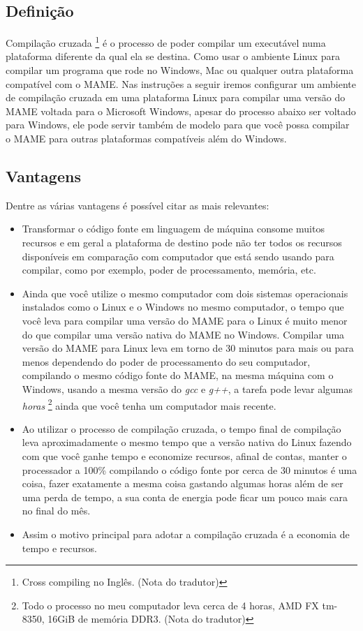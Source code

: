 \documentclass[letterpaper,10pt,brazil]{sphinxmanual}
\begin{document}
\subsection{Definição}
\label{initialsetup/crosscompilemame:definicao}
Compilação cruzada \footnote[1]{\sphinxAtStartFootnote%
Cross compiling no Inglês. (Nota do tradutor)
} é o processo de poder compilar um executável
numa plataforma diferente da qual ela se destina. Como usar o ambiente
Linux para compilar um programa que rode no Windows, Mac ou qualquer
outra plataforma compatível com o MAME.
Nas instruções a seguir iremos  configurar um ambiente de compilação
cruzada em uma plataforma Linux para compilar uma versão do MAME voltada
para o Microsoft Windows, apesar do processo abaixo ser voltado para
Windows, ele pode servir também de modelo para que você possa compilar o
MAME para outras plataformas compatíveis além do Windows.


\subsection{Vantagens}
\label{initialsetup/crosscompilemame:vantagens}
Dentre as várias vantagens é possível citar as mais relevantes:
\begin{itemize}
\item {} 
Transformar o código fonte em linguagem de máquina consome muitos
recursos e em geral a plataforma de destino pode não ter todos os
recursos disponíveis em comparação com computador que está sendo
usando para compilar, como por exemplo, poder de processamento,
memória, etc.

\item {} 
Ainda que você utilize o mesmo computador com dois sistemas
operacionais instalados como o Linux e o Windows no mesmo
computador, o tempo que você leva para compilar uma versão do MAME
para o Linux é muito menor do que compilar uma versão nativa do
MAME no Windows. Compilar uma versão do MAME para Linux leva em
torno de 30 minutos para mais ou para menos dependendo do poder de
processamento do seu computador, compilando o mesmo código fonte do
MAME, na mesma máquina com o Windows, usando a mesma versão do \emph{gcc}
e \emph{g++}, a tarefa pode levar algumas \emph{horas} \footnote[2]{\sphinxAtStartFootnote%
Todo o processo no meu computador leva cerca de 4 horas, AMD FX
tm-8350, 16GiB de memória DDR3. (Nota do tradutor)
} ainda que você tenha um
computador mais recente.

\item {} 
Ao utilizar o processo de compilação cruzada, o tempo final de
compilação leva aproximadamente o mesmo tempo que a versão nativa do
Linux fazendo com que você ganhe tempo e economize recursos, afinal
de contas, manter o processador a 100\% compilando o código fonte por
cerca de 30 minutos é uma coisa, fazer exatamente a mesma coisa
gastando algumas horas além de ser uma perda de tempo, a sua conta
de energia pode ficar um pouco mais cara no final do mês.

\item {} 
Assim o motivo principal para adotar a compilação cruzada é a
economia de tempo e recursos.

\end{itemize}
\end{document}
